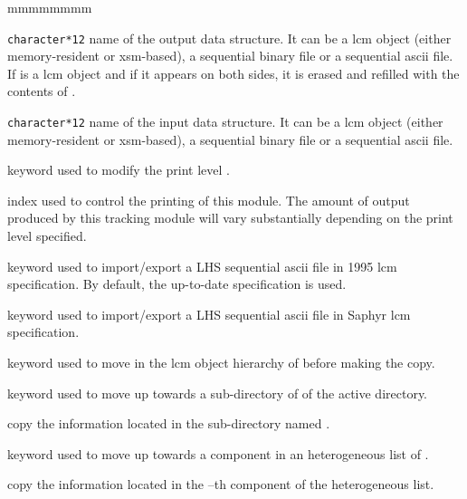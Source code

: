 \begin{ListeDeDescription}{mmmmmmmm}

\item[\dusa{NAME1}] {\tt character*12} name of the output data
structure. It can be a {\sc lcm} object (either memory-resident or {\sc xsm}-based), a sequential binary file or
a sequential {\sc ascii} file. If  is a {\sc lcm} object and if it appears on both sides,
it is erased and refilled with the contents of .

\item[\dusa{NAME2}] {\tt character*12} name of the input data
structure. It can be a {\sc lcm} object (either memory-resident or {\sc xsm}-based), a sequential binary file or
a sequential {\sc ascii} file.

\item[\moc{EDIT}] keyword used to modify the print level .

\item[\dusa{iprint}] index used to control the printing of this module. The
amount of output produced by this tracking module will vary substantially
depending on the print level specified.

\item[\moc{OLD}] keyword used to import/export a LHS sequential {\sc ascii} file in 1995 {\sc lcm} specification. By
default, the up-to-date specification is used.

\item[\moc{SAP}] keyword used to import/export a LHS sequential {\sc ascii} file in Saphyr {\sc lcm} specification.

\item[\moc{STEP}] keyword used to move in the {\sc lcm} object hierarchy of  before making the copy.

\item[\moc{UP}] keyword used to move up towards a sub-directory of  of the
active directory.

\item[\dusa{NOMDIR}] copy the information located in the sub-directory named .

\item[\moc{AT}] keyword used to move up towards a component in an heterogeneous list of .

\item[\dusa{index}] copy the information located in the --th component of the heterogeneous list.

\end{ListeDeDescription}

